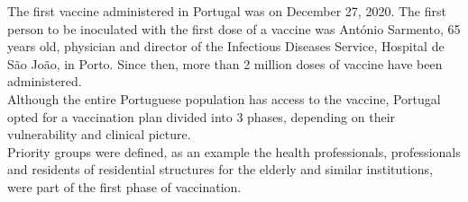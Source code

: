 

  The first vaccine administered in Portugal was on December 27, 2020. The first person to be inoculated with the first dose of a vaccine was António Sarmento, 65 years old, physician and director of the Infectious Diseases Service, Hospital de São João, in Porto. Since then, more than 2 million doses of vaccine have been administered.
   \\
   Although the entire Portuguese population has access to the vaccine,  Portugal opted for a vaccination plan divided into 3 phases, depending on their vulnerability and clinical picture.  
\\
Priority groups were defined, as an example the health professionals, professionals and residents of residential structures for the elderly and similar institutions, were part of the first phase of vaccination.

   
